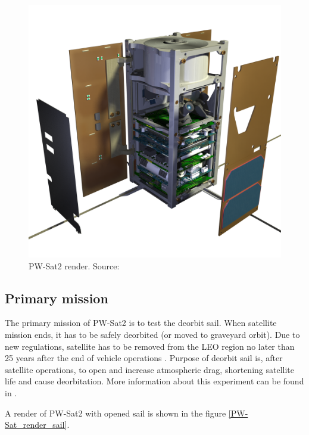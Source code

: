     \begin{figure}[H]
        \centering
        \includegraphics[width=0.65\paperwidth]{img/04/PW-Sat2_render_01.png}
        \caption{PW-Sat2 render. Source: \cite{PW_sat2_photo}}
        \label{PW-Sat_render_01}
    \end{figure}




    \subsection{Primary mission}
        The primary mission of PW-Sat2 is to test the deorbit sail. When satellite mission ends, it has to be safely deorbited (or moved to graveyard orbit). Due to new regulations, satellite has to be removed from
        the LEO region no later than 25 years after the end of vehicle operations \cite{Satellite_disposal}. Purpose of deorbit sail is, after satellite operations, to open and increase atmospheric drag, shortening satellite life and cause deorbitation. More information about this experiment can be found in \cite{DDC_article}.

        A render of PW-Sat2 with opened sail is shown in the figure \ref{PW-Sat_render_sail}.

